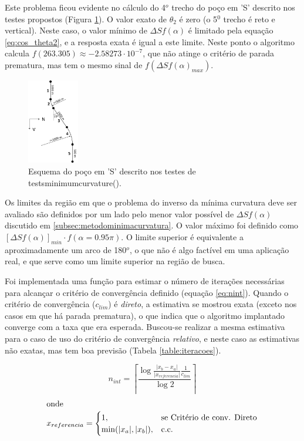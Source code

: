 \documentclass[final,5p]{elsarticle}
\numberwithin{equation}{section}
\begin{document}
    Este problema ficou evidente no cálculo do 4$^o$ trecho do poço em 'S' descrito nos testes propostos (Figura \ref{fig:pocoS}). O valor exato de $\theta_2$ é zero (o 5$^0$ trecho é reto e vertical). Neste caso, o valor mínimo de $\Delta S f(\alpha)$ é limitado pela equação \ref{eq:cos_theta2}, e a resposta exata é igual a este limite. Neste ponto o algoritmo calcula $f(263.305) \approx -2.58273 \cdot 10^{-7}$, que não atinge o critério de parada prematura, mas tem o mesmo sinal de $f(\Delta S f(\alpha)_{max})$.

    \begin{figure}[hbt!]
        \label{fig:pocoS}
        \centering
        \includegraphics[width=0.2\textwidth]{EsquemaPoco}
        \caption{Esquema do poço em 'S' descrito nos testes de tests\textunderscore minimum\textunderscore curvature().}
    \end{figure}

    Os limites da região em que o problema do inverso da mínima curvatura deve ser avaliado são definidos por um lado pelo menor valor possível de $\Delta S f(\alpha)$ discutido em \ref{subsec:metodominimacurvatura}. O valor máximo foi definido como $[\Delta S f(\alpha)]_{min} \cdot f(\alpha = 0.95\pi)$. O limite superior é equivalente a aproximadamente um arco de 180$^o$, o que não é algo factível em uma aplicação real, e que serve como um limite superior na região de busca.

    Foi implementada uma função para estimar o número de iterações necessárias para alcançar o critério de convergência definido (equação \ref{eq:nint}). Quando o critério de convergência ($c_{lim}$) é \emph{direto}, a estimativa se mostrou exata (exceto nos casos em que há parada prematura), o que indica que o algoritmo implantado converge com a taxa que era esperada. Buscou-se realizar a mesma estimativa para o caso de uso do critério de convergência \emph{relativo}, e neste caso as estimativas não exatas, mas tem boa previsão (Tabela \ref{table:iteracoes}).
    
    \begin{equation} \label{eq:nint}
        n_{int} = \left \lceil \frac{\log{\frac{|x_b-x_a|}{|x_{referencia}|}\frac{1}{c_{lim}}}}{\log{2}} \right \rceil
    \end{equation}
    \begin{align*}
        \intertext{onde}
        x_{referencia} = \begin{cases}
            1,&\text{se Critério de conv. Direto} \\
            \min(|x_a|,|x_b|),&\text{c.c. }  
        \end{cases}
    \end{align*}
    
\end{document}
